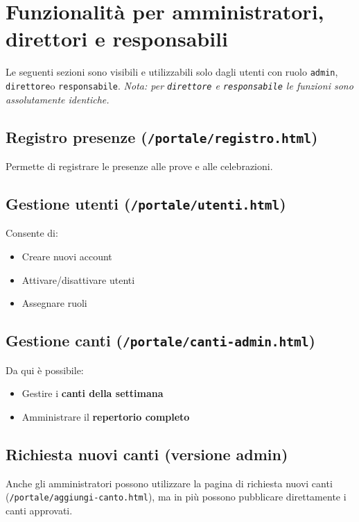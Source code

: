 \documentclass[a4paper,12pt]{article}
\newcommand{\roleadmin}{\texttt{admin}}
\newcommand{\roledirettore}{\texttt{direttore}}
\newcommand{\roleresponsabile}{\texttt{responsabile}}
\begin{document}
	\section{Funzionalità per amministratori, direttori e responsabili}
	
	Le seguenti sezioni sono visibili e utilizzabili solo dagli utenti con ruolo \roleadmin, \roledirettore o \roleresponsabile.  
	\textit{Nota: per \roledirettore{} e \roleresponsabile{} le funzioni sono assolutamente identiche.}
	
	\subsection{Registro presenze (\texttt{/portale/registro.html})}
	
	Permette di registrare le presenze alle prove e alle celebrazioni.
	
	\subsection{Gestione utenti (\texttt{/portale/utenti.html})}
	
	Consente di:
	\begin{itemize}
		\item Creare nuovi account
		\item Attivare/disattivare utenti
		\item Assegnare ruoli
	\end{itemize}
	
	\subsection{Gestione canti (\texttt{/portale/canti-admin.html})}
	
	Da qui è possibile:
	\begin{itemize}
		\item Gestire i \textbf{canti della settimana}
		\item Amministrare il \textbf{repertorio completo}
	\end{itemize}
	
	\subsection{Richiesta nuovi canti (versione admin)}
	
	Anche gli amministratori possono utilizzare la pagina di richiesta nuovi canti (\texttt{/portale/aggiungi-canto.html}), ma in più possono pubblicare direttamente i canti approvati.
	
\end{document}
